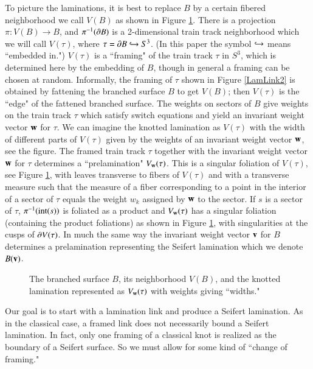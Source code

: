 \documentclass[12pt]{article}
\theoremstyle{remark}
\begin{document}
\begin{example}
To picture the laminations, it is best to replace $B$ by a certain fibered neighborhood we call $V(B)$ as shown in Figure \ref{BranchedNeighborhood}.  There is a projection $\pi:V(B)\to B$, and $\pi^{-1}(\partial B)$ is a 2-dimensional train track neighborhood which we will call $V(\tau)$, where $\tau=\partial B\hookrightarrow S^3$.  (In this paper the symbol $\hookrightarrow$ means ``embedded in.")   $V(\tau)$ is a ``framing" of the train track $\tau$ in $S^3$, which is determined here by the embedding of $B$, though in general a framing can be chosen at random.  Informally, the framing of $\tau$ shown in Figure \ref{LamLink2} is obtained by fattening the branched surface $B$ to get $V(B)$; then $V(\tau)$ is the ``edge" of the fattened branched surface.  The weights on sectors of $B$ give weights on the train track $\tau$ which satisfy switch equations and yield an invariant weight vector ${\bf w}$ for $\tau$.  We can imagine the knotted lamination as $V(\tau)$ with the width of different parts of $V(\tau)$ given by the weights of an invariant weight vector ${\bf w}$, see the figure.  The framed train track $\tau$ together with the invariant weight vector ${\bf w}$ for $\tau$ determines a ``prelamination" $V_{\bf w}(\tau)$.   This is a singular foliation of $V(\tau)$, see  Figure \ref{BranchedNeighborhood}, with leaves transverse to fibers of $V(\tau)$ and with a transverse measure such that the measure of a fiber corresponding to a point in the interior of a sector of $\tau$ equals the weight $w_k$ assigned by ${\bf w}$ to the sector.  If $s$ is a sector of $\tau$, $\pi^{-1}({\rm int}(s))$ is foliated as a product and $V_{\bf w}(\tau)$ has a singular foliation (containing the product foliations) as shown in Figure \ref{BranchedNeighborhood}, with singularities at the cusps of $\partial V(\tau)$.  In much the same way the invariant weight vector ${\bf v}$ for $B$ determines a prelamination representing the Seifert lamination which we denote $B({\bf v})$.



\begin{figure}[H]
\centering
{}
\caption{\footnotesize The branched surface $B$, its neighborhood $V(B)$, and the knotted lamination represented as $V_{\bf w}(\tau)$ with weights giving ``widths."}
\label{BranchedNeighborhood}
\end{figure}
\end{example} 

Our goal is to start with a lamination link and produce a Seifert lamination.  As in the classical case, a framed link does not necessarily bound a Seifert lamination.   In fact, only one framing of a classical knot is realized as the boundary of a Seifert surface.   So we must allow for some kind of ``change of framing."
\end{document}
